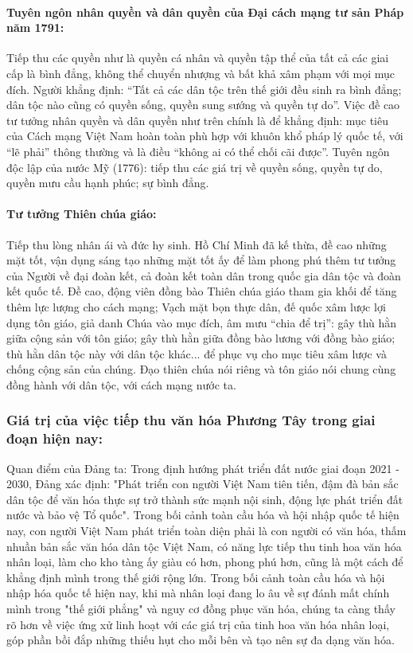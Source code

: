 \paragraph{Tuyên ngôn nhân quyền và dân quyền của Đại cách mạng tư sản Pháp năm 1791:}
Tiếp thu các quyền như là quyền cá nhân và quyền tập thể của tất cả các giai cấp là bình đẳng, không thể chuyển nhượng và bất khả xâm phạm với mọi mục đích. Người khẳng định: ``Tất cả các dân tộc trên thế giới đều sinh ra bình đẳng; dân tộc nào cũng có quyền sống, quyền sung sướng và quyền tự do''. Việc đề cao tư tưởng nhân quyền và dân quyền như trên chính là để khẳng định: mục tiêu của Cách mạng Việt Nam hoàn toàn phù hợp với khuôn khổ pháp lý quốc tế, với ``lẽ phải'' thông thường và là điều ``không ai có thể chối cãi được''.
Tuyên ngôn độc lập của nước Mỹ (1776): tiếp thu các giá trị về quyền sống, quyền tự do, quyền mưu cầu hạnh phúc;
sự bình đẳng.

\paragraph{Tư tưởng Thiên chúa giáo:}
Tiếp thu lòng nhân ái và đức hy sinh. Hồ Chí Minh đã kế thừa, đề cao những mặt tốt, vận dụng sáng tạo những mặt tốt ấy để làm phong phú thêm tư tưởng của Người về đại đoàn kết, cả đoàn kết toàn dân trong quốc gia dân tộc và đoàn kết quốc tế. Đề cao, động viên đồng bào Thiên chúa giáo tham gia khối để tăng thêm lực lượng cho cách mạng; Vạch mặt bọn thực dân, đế quốc xâm lược lợi dụng tôn giáo, giả danh Chúa vào mục đích, âm mưu ``chia để trị'': gây thù hằn giữa cộng sản với tôn giáo; gây thù hằn giữa đồng bào lương với đồng bào giáo; thù hằn dân tộc này với dân tộc khác... để phục vụ cho mục tiêu xâm lược và chống cộng sản của chúng. Đạo thiên chúa nói riêng và tôn giáo nói chung cùng đồng hành với dân tộc, với cách mạng nước ta.

\subsubsection{Giá trị của việc tiếp thu văn hóa Phương Tây trong giai đoạn hiện nay:}

Quan điểm của Đảng ta: Trong định hướng phát triển đất nước giai đoạn 2021 - 2030, Đảng xác định: "Phát triển con người Việt Nam tiên tiến, đậm đà bản sắc dân tộc để văn hóa thực sự trở thành sức mạnh nội sinh, động lực phát triển đất nước và bảo vệ Tổ quốc". Trong bối cảnh toàn cầu hóa và hội nhập quốc tế hiện nay, con người Việt Nam phát triển toàn diện phải là con người có văn hóa, thấm nhuần bản sắc văn hóa dân tộc Việt Nam, có năng lực tiếp thu tinh hoa văn hóa nhân loại, làm cho kho tàng ấy giàu có hơn, phong phú hơn, cũng là một cách để khẳng định mình trong thế giới rộng lớn. Trong bối cảnh toàn cầu hóa và hội nhập hóa quốc tế hiện nay, khi mà nhân loại đang lo âu về sự đánh mất chính mình trong "thế giới phẳng" và nguy cơ đồng phục văn hóa, chúng ta càng thấy rõ hơn về việc ứng xử linh hoạt với các giá trị của tinh hoa văn hóa nhân loại, góp phần bồi đắp những thiếu hụt cho mỗi bên và tạo nên sự đa dạng văn hóa.

